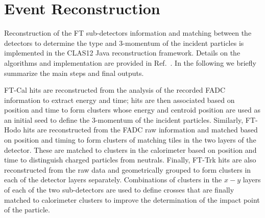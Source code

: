 \section{Event Reconstruction}

Reconstruction of the FT sub-detectors information and matching between the detectors to determine the type and
3-momentum of the incident particles is implemented in the CLAS12 Java reconstruction framework. Details on
the algorithms and implementation are provided in Ref.~\cite{reconstruction}. In the following we briefly summarize
the main steps and final outputs.

FT-Cal hits are reconstructed from the analysis of the recorded FADC information to extract energy and time;
hits are then associated based on position and time to form clusters whose energy and centroid position are used
as an initial seed to define the 3-momentum of the incident particles. Similarly, FT-Hodo hits are reconstructed
from the FADC raw information and matched based on position and timing to form clusters of matching tiles in the
two layers of the detector. These are matched to clusters in the calorimeter based on position and time to distinguish
charged particles from neutrals. Finally, FT-Trk hits are also reconstructed from the raw data and geometrically
grouped to form clusters in each of the detector layers separately. Combinations of clusters in the $x-y$ layers of
each of the two sub-detectors are used to define crosses that are finally matched to calorimeter clusters to improve
the determination of the impact point of the particle.

